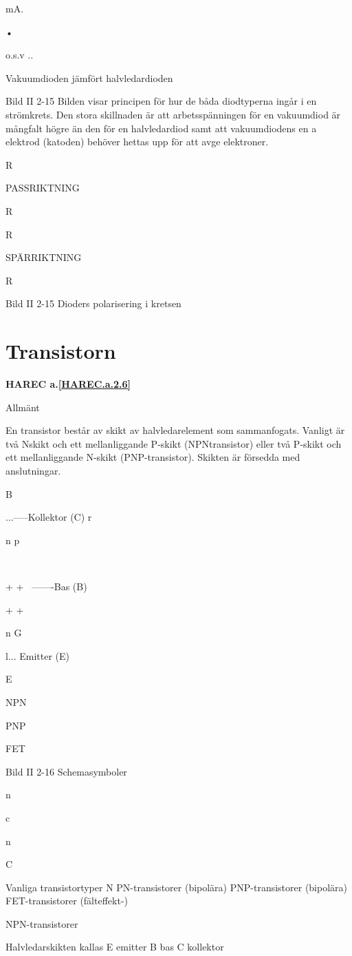 {mA.

•

o.s.v ..

Vakuumdioden jämfört halvledardioden

Bild II 2-15
Bilden visar principen för hur de båda diodtyperna ingår i en strömkrets. Den stora
skillnaden är att arbetsspänningen för en
vakuumdiod är mångfalt högre än den för en
halvledardiod samt att vakuumdiodens en a
elektrod (katoden) behöver hettas upp för att
avge elektroner.

R

PASSRIKTNING

R

R

SPÄRRIKTNING

R

Bild II 2-15 Dioders polarisering i kretsen

\section{Transistorn}
\textbf{HAREC a.\ref{HAREC.a.2.6}\label{myHAREC.a.2.6}}

Allmänt

En transistor består av skikt av halvledarelement som sammanfogats. Vanligt är två Nskikt och ett mellanliggande P-skikt (NPNtransistor) eller två P-skikt och ett mellanliggande N-skikt (PNP-transistor). Skikten är
försedda med anslutningar.

B~

...-----Kollektor
(C)
r

n
p

~

+ + ~-------Bas (B)

+ +
~

n
G

l... Emitter (E)

E

NPN

PNP

FET

Bild II 2-16 Schemasymboler

n

c

n

C

Vanliga transistortyper
N PN-transistorer (bipolära)
PNP-transistorer (bipolära)
FET-transistorer (fälteffekt-)

NPN-transistorer

Halvledarskikten kallas
E emitter
B bas
C kollektor

}
